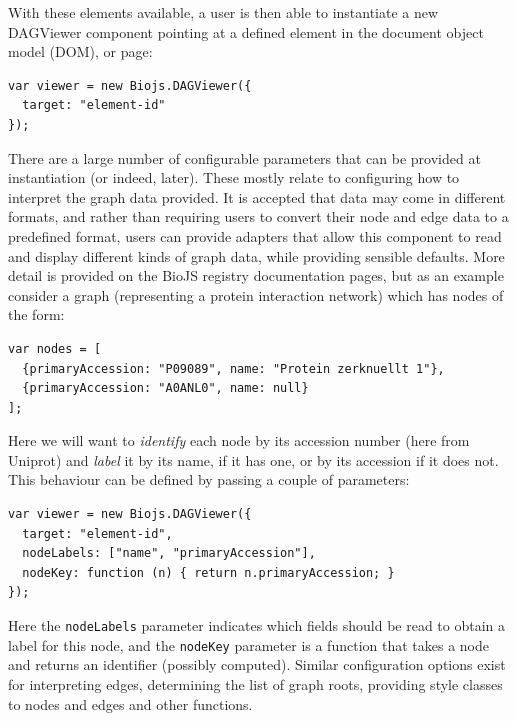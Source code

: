 \documentclass[10pt,a4paper,twocolumn]{article}
\begin{document}
With these elements available, a user is then able to instantiate a new
DAGViewer component pointing at a defined element in the document object model
(DOM), or page:

\begin{lstlisting}[caption={Instantiating a new DAGViewer Component}, label={code:new}]
var viewer = new Biojs.DAGViewer({
  target: "element-id"
});
\end{lstlisting}

There are a large number of configurable parameters that can be provided at
instantiation (or indeed, later). These mostly relate to configuring how to
interpret the graph data provided. It is accepted that data may come in
different formats, and rather than requiring users to convert their node and
edge data to a predefined format, users can provide adapters that allow this
component to read and display different kinds of graph data, while providing
sensible defaults. More detail is provided on the BioJS registry documentation
pages, but as an example consider a graph (representing a protein interaction
network) which has nodes of the form:

\begin{lstlisting}[caption={Example Nodes}, label={code:example-nodes}]
var nodes = [
  {primaryAccession: "P09089", name: "Protein zerknuellt 1"},
  {primaryAccession: "A0ANL0", name: null}
];
\end{lstlisting}

Here we will want to \textit{identify} each node by its accession number (here
from Uniprot) and \textit{label} it by its name, if it has one, or by its
accession if it does not. This behaviour can be defined by passing a couple of
parameters:

\begin{lstlisting}[caption={Node Adaptor Example}, label={code:node-adaptor}]
var viewer = new Biojs.DAGViewer({
  target: "element-id",
  nodeLabels: ["name", "primaryAccession"],
  nodeKey: function (n) { return n.primaryAccession; }
});
\end{lstlisting}

Here the \texttt{nodeLabels} parameter indicates which fields should be read to
obtain a label for this node, and the \texttt{nodeKey} parameter is a function
that takes a node and returns an identifier (possibly computed). Similar
configuration options exist for interpreting edges, determining the list of
graph roots, providing style classes to nodes and edges and other functions.
\end{document}
